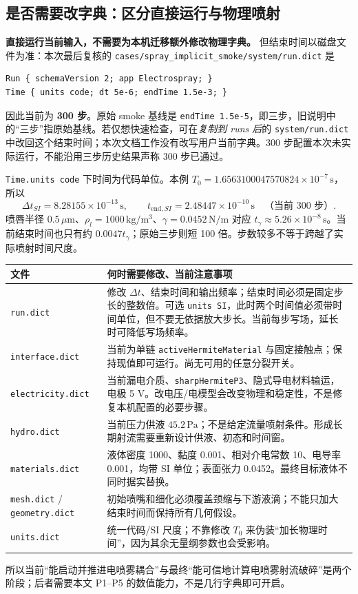 \documentclass[11pt,a4paper]{article}
\newcommand{\code}[1]{{\small\nolinkurl{#1}}}
\begin{document}
\subsection{是否需要改字典：区分直接运行与物理喷射}
\textbf{直接运行当前输入，不需要为本机迁移额外修改物理字典。} 但结束时间以磁盘文件为准：本次最后复核的 \code{cases/spray_implicit_smoke/system/run.dict} 是
\begin{lstlisting}
Run { schemaVersion 2; app Electrospray; }
Time { units code; dt 5e-6; endTime 1.5e-3; }
\end{lstlisting}
因此当前为 \textbf{300 步}。原始 smoke 基线是 \code{endTime 1.5e-5}，即三步，旧说明中的“三步”指原始基线。若仅想快速检查，可在\emph{复制到 runs 后}的 \code{system/run.dict} 中改回这个结束时间；本次文档工作没有改写用户当前字典。300 步配置本次未实际运行，不能沿用三步历史结果声称 300 步已通过。

\code{Time.units code} 下时间为代码单位。本例 $T_0=1.6563100047570824\times10^{-7}\,\mathrm{s}$，所以
\begin{equation}
\Delta t_{SI}=8.28155\times10^{-13}\,\mathrm{s},\qquad
t_{\mathrm{end},SI}=2.48447\times10^{-10}\,\mathrm{s}\quad\text{（当前 300 步）}.
\end{equation}
喷唇半径 $0.5\,\mu\mathrm m$、$\rho_l=1000\,\mathrm{kg/m^3}$、$\gamma=0.0452\,\mathrm{N/m}$ 对应 $t_\gamma\approx5.26\times10^{-8}\,\mathrm s$。当前结束时间也只有约 $0.0047t_\gamma$；原始三步则短 100 倍。步数较多不等于跨越了实际喷射时间尺度。

\begin{longtable}{L{34mm}L{117mm}}
\toprule 文件 & 何时需要修改、当前注意事项\\\midrule\endhead
\code{run.dict} & 修改 $\Delta t$、结束时间和输出频率；结束时间必须是固定步长的整数倍。可选 \code{units SI}，此时两个时间值必须带时间单位，但不要无依据放大步长。当前每步写场，延长时可降低写场频率。\\
\code{interface.dict} & 当前为单链 \code{activeHermiteMaterial} 与固定接触点；保持现值即可运行。尚无可用的任意分裂开关。\\
\code{electricity.dict} & 当前漏电介质、\code{sharpHermiteP3}、隐式导电材料输运，电极 5 V。改电压/电模型会改变物理和稳定性，不是修复本机配置的必要步骤。\\
\code{hydro.dict} & 当前压力供液 $45.2\,\mathrm{Pa}$；不是给定流量喷射条件。形成长期射流需要重新设计供液、初态和时间窗。\\
\code{materials.dict} & 液体密度 1000、黏度 0.001、相对介电常数 10、电导率 0.001，均带 SI 单位；表面张力 0.0452。最终目标液体不同时据实替换。\\
\code{mesh.dict} / \code{geometry.dict} & 初始喷嘴和细化必须覆盖颈缩与下游液滴；不能只加大结束时间而保持所有几何假设。\\
\code{units.dict} & 统一代码/SI 尺度；不靠修改 $T_0$ 来伪装“加长物理时间”，因为其余无量纲参数也会受影响。\\\bottomrule
\end{longtable}
所以当前“能启动并推进电喷雾耦合”与最终“能可信地计算电喷雾射流破碎”是两个阶段；后者需要本文 P1--P5 的数值能力，不是几行字典即可开启。
\end{document}
